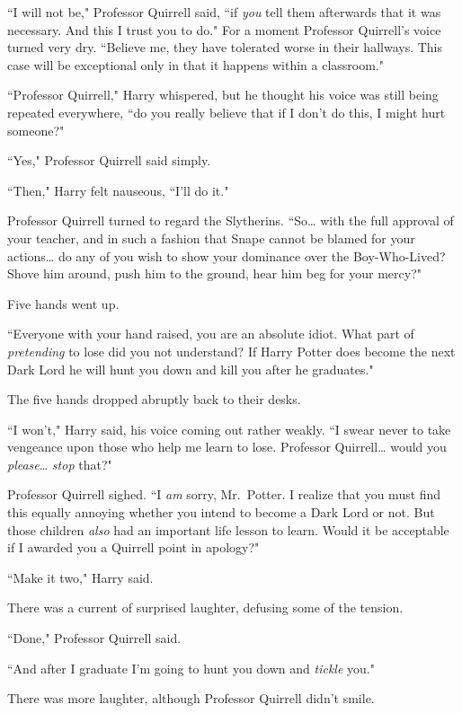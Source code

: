``I will not be," Professor Quirrell said, ``if \emph{you} tell them afterwards that it was necessary. And this I trust you to do." For a moment Professor Quirrell's voice turned very dry. ``Believe me, they have tolerated worse in their hallways. This case will be exceptional only in that it happens within a classroom."

``Professor Quirrell," Harry whispered, but he thought his voice was still being repeated everywhere, ``do you really believe that if I don't do this, I might hurt someone?"

``Yes," Professor Quirrell said simply.

``Then," Harry felt nauseous, ``I'll do it."

Professor Quirrell turned to regard the Slytherins. ``So{\ldots} with the full approval of your teacher, and in such a fashion that Snape cannot be blamed for your actions{\ldots} do any of you wish to show your dominance over the Boy-Who-Lived? Shove him around, push him to the ground, hear him beg for your mercy?"

Five hands went up.

``Everyone with your hand raised, you are an absolute idiot. What part of \emph{pretending} to lose did you not understand? If Harry Potter does become the next Dark Lord he will hunt you down and kill you after he graduates."

The five hands dropped abruptly back to their desks.

``I won't," Harry said, his voice coming out rather weakly. ``I swear never to take vengeance upon those who help me learn to lose. Professor Quirrell{\ldots} would you \emph{please}{\ldots} \emph{stop} that?"

Professor Quirrell sighed. ``I \emph{am} sorry, Mr.~Potter. I realize that you must find this equally annoying whether you intend to become a Dark Lord or not. But those children \emph{also} had an important life lesson to learn. Would it be acceptable if I awarded you a Quirrell point in apology?"

``Make it two," Harry said.

There was a current of surprised laughter, defusing some of the tension.

``Done," Professor Quirrell said.

``And after I graduate I'm going to hunt you down and \emph{tickle} you."

There was more laughter, although Professor Quirrell didn't smile.

